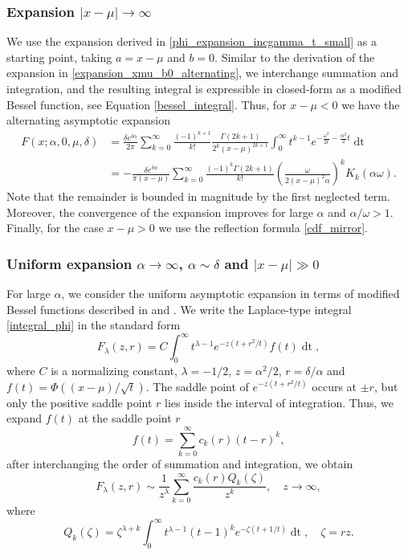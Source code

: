 \documentclass[10pt,a4paper,oneside]{article}
\numberwithin{equation}{section}
\begin{document}
\subsubsection{Expansion $|x-\mu| \to \infty$}
We use the expansion derived in \eqref{phi_expansion_incgamma_t_small} as a starting point, taking $a = x-\mu$ and $b = 0$. Similar to the derivation of the expansion in \eqref{expansion_xmu_b0_alternating}, we interchange summation and integration, and the resulting integral is expressible in closed-form as a modified Bessel function, see Equation \eqref{bessel_integral}. Thus, for $x - \mu < 0$ we have the alternating asymptotic expansion
\begin{align}
F(x; \alpha, 0, \mu, \delta) &= \frac{\delta e^{\delta \alpha}}{2\pi} \sum_{k=0}^{\infty} \frac{(-1)^{k+1}}{k!} \frac{\Gamma(2k + 1)}{2^k (x-\mu)^{2k + 1}} \int_0^{\infty} t^{k-1} e^{-\frac{\omega^2}{2t} - \frac{\alpha^2}{2}t} \mathop{dt} \nonumber \\
&= -\frac{\delta e^{\delta \alpha}}{\pi (x-\mu)} \sum_{k=0}^{\infty}\frac{(-1)^k\Gamma(2k + 1)}{k!} \left(\frac{\omega}{2(x-\mu)^2\alpha}\right)^k K_k(\alpha \omega).
\end{align}
Note that the remainder is bounded in magnitude by the first neglected term. Moreover, the convergence of the expansion improves for large $\alpha$ and $\alpha / \omega > 1$. Finally, for the case $x - \mu > 0$ we use the reflection formula \eqref{cdf_mirror}.

\subsubsection{Uniform expansion $\alpha \to \infty$, $\alpha \sim \delta$ and $|x-\mu| \gg 0$}\label{uniform_expansion_alpha_large}
For large $\alpha$, we consider the uniform asymptotic expansion in terms of modified Bessel functions described in \cite{Temme1990c} and \cite[\S 27]{Temme2015}. We write the Laplace-type integral \eqref{integral_phi} in the standard form
\begin{equation*}
F_{\lambda}(z, r) = C\int_0^{\infty} t^{\lambda - 1} e^{-z\left(t + r^2/t\right)} f(t) \mathop{dt},
\end{equation*}
where $C$ is a normalizing constant, $\lambda=-1/2$, $z = \alpha^2/2$, $r=\delta/\alpha$ and $f(t) = \Phi((x-\mu)/\sqrt{t})$. The saddle point of $e^{-z\left(t + r^2/t\right)}$ occurs at $\pm r$, but only the positive saddle point $r$ lies inside the interval of integration. Thus, we expand $f(t)$ at the saddle point $r$
\begin{equation*}
f(t) = \sum_{k=0}^{\infty} c_k(r)(t-r)^k,
\end{equation*}
after interchanging the order of summation and integration, we obtain 
\begin{equation}
F_{\lambda}(z, r) \sim \frac{1}{z^{\lambda}} \sum_{k=0}^{\infty} \frac{c_k(r) Q_k(\zeta)}{z^k}, \quad z \to \infty,
\end{equation}
where
\begin{equation*}
Q_k(\zeta) = \zeta^{\lambda + k}\int_0^{\infty} t^{\lambda - 1}(t-1)^k e^{-\zeta(t + 1/t)} \mathop{dt}, \quad \zeta = rz.
\end{equation*}
\end{document}
